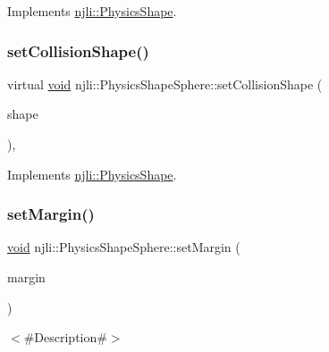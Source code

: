 Implements \mbox{\hyperlink{classnjli_1_1_physics_shape_a2ac8a109a5ad67ee79f40ce8f28337cf}{njli\+::\+Physics\+Shape}}.

\mbox{\label{classnjli_1_1_physics_shape_sphere_a6c4f6e4cd8f796892bce7c3c09f0d14b}} 
\subsubsection{\texorpdfstring{set\+Collision\+Shape()}{setCollisionShape()}}
{\footnotesize\ttfamily virtual \mbox{\hyperlink{_thread_8h_af1e856da2e658414cb2456cb6f7ebc66}{void}} njli\+::\+Physics\+Shape\+Sphere\+::set\+Collision\+Shape (\begin{DoxyParamCaption}\item[{const bt\+Collision\+Shape \&}]{shape }\end{DoxyParamCaption})\hspace{0.3cm}{\ttfamily [protected]}, {\ttfamily [virtual]}}



Implements \mbox{\hyperlink{classnjli_1_1_physics_shape_a441e82a42f3b588a409c3b6c41288abd}{njli\+::\+Physics\+Shape}}.

\mbox{\label{classnjli_1_1_physics_shape_sphere_a0e111b3b9189d7851bce31d92405244b}} 
\subsubsection{\texorpdfstring{set\+Margin()}{setMargin()}}
{\footnotesize\ttfamily \mbox{\hyperlink{_thread_8h_af1e856da2e658414cb2456cb6f7ebc66}{void}} njli\+::\+Physics\+Shape\+Sphere\+::set\+Margin (\begin{DoxyParamCaption}\item[{\mbox{\hyperlink{_util_8h_a5f6906312a689f27d70e9d086649d3fd}{f32}}}]{margin }\end{DoxyParamCaption})}

$<$\#\+Description\#$>$


